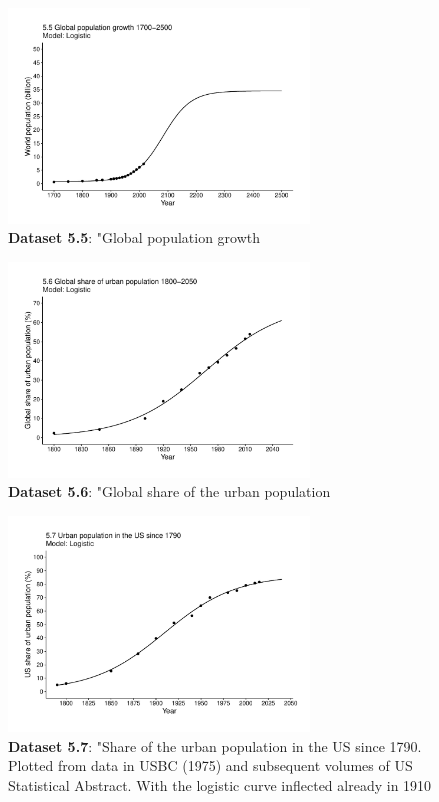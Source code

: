 \documentclass[aps,rmp,preprint,superscriptaddress,10pt,onecolumn]{article}
\begin{document}
\begin{figure}[h]
\includegraphics[width=8cm]{output/figs-ggplot/5.5.pdf}
\caption{\textbf{Dataset 5.5}: "Global population growth}
\end{figure}
	
\begin{figure}[h]
\includegraphics[width=8cm]{output/figs-ggplot/5.6.pdf}
\caption{\textbf{Dataset 5.6}: "Global share of the urban population}
\end{figure}
	
\begin{figure}[h]
\includegraphics[width=8cm]{output/figs-ggplot/5.7.pdf}
\caption{\textbf{Dataset 5.7}: "Share of the urban population in the US since 1790. Plotted from data in USBC (1975) and subsequent volumes of US Statistical Abstract. With the logistic curve inflected already in 1910}
\end{figure}
	
\end{document}
